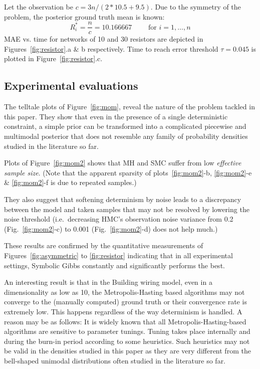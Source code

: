 \documentclass[]{article}
\begin{document}
Let the observation be $c = {3n}/{(2*10.5 + 9.5)}$.
Due to the symmetry of the problem, the posterior ground truth mean is known:
\begin{equation*}
R_i^* = \frac{n}{c} = 10.166667\qquad \text{ for } i = 1, \ldots, n
\end{equation*}
MAE vs. time for networks of 10 and 30 resistors are depicted in 
Figures~\ref{fig:resistor}.a \& b respectively.
Time to reach error threshold $\tau = 0.045$ is plotted in 
Figure~\ref{fig:resistor}.c.


\subsection{Experimental evaluations}
\label{sect:experimental.evaluations}
The telltale plots of Figure~\ref{fig:mom}, reveal the nature of the problem tackled in this paper.
They show that even in the presence of a single deterministic constraint, 
a simple prior can be transformed into a complicated piecewise and multimodal posterior that does not resemble any family of 
probability densities studied in the literature so far. 

Plots of Figure~\ref{fig:mom2} shows that MH and SMC suffer from low \emph{effective sample size}. 
(Note that the apparent sparsity of plots~\ref{fig:mom2}-b, \ref{fig:mom2}-e \& \ref{fig:mom2}-f is due to {\color{red}repeated samples}.)

They also suggest that  softening determinism by noise leads to a 
{\color{red} discrepancy between the model and taken samples} 
that may not be resolved by lowering the noise threshold 
(i.e.\ decreasing HMC's observation noise variance from 0.2 
(Fig.~\ref{fig:mom2}-c) 
to 0.001 (Fig.~\ref{fig:mom2}-d) does not help much.)

These results are confirmed by the quantitative measurements of 
Figures~\ref{fig:asymmetric} to %
\ref{fig:resistor} indicating that in all experimental settings,
Symbolic Gibbs constantly and significantly performs the best.

An interesting result is that in the Building wiring model, even in a dimensionality as low as 10, 
the Metropolis-Hasting based algorithms may not converge to the (manually computed) ground truth or their convergence rate is extremely low. 
This happens regardless of the way determinism is handled. 
A reason may be as follows:
It is widely known that all Metropolis-Hasting-based algorithms are sensitive to parameter tunings.
Tuning takes place internally and during the burn-in period according to some heuristics.
Such heuristics may not be valid in the densities studied in this paper as they are very different from the bell-shaped unimodal distributions often studied in the literature so far.
\end{document}
